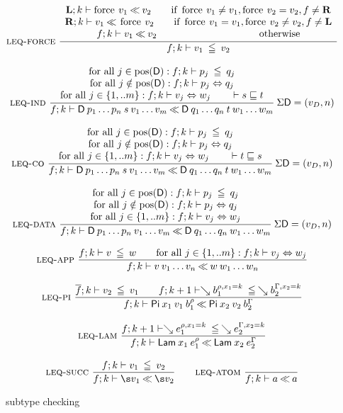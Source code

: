 \begin{figure}[htp]
\begin{gather*}
\nxru{\leqforce}
{\FleqVal{\lF}{k}{\forc \: v_1}{v_2} \qquad \mbox{if } \forc \: v_1 \neq v_1 , \forc \: v_2 = v_2  , f \neq \rF
}
{\FleqVal{\rF}{k}{v_1}{\forc \: v_2} \qquad \mbox{if } \forc \: v_1 = v_1 , \forc \: v_2 \neq v_2 , f \neq \lF }
{\FleqVal{f}{k}{v_1}{v_2} \qquad \qquad \qquad \qquad \qquad \mbox{ otherwise}}
{\LeqVal{f}{k}{v_1}{v_2}}
\\[2ex]
\nxru{\leqappind}
{\mbox{for all } j \in \pos(\DD): \LeqVal{f}{k}{p_j}{q_j} 
}
{
\mbox{for all } j \notin \pos(\DD): \EqVal{f}{k}{p_j}{q_j} 
}
{\mbox{for all } j \in \{1,..m\}: \EqVal{f}{k}{v_j}{w_j}
\qquad
\SzLeq s t }
{\FleqVal{f}{k}{\DD \: p_1 \ldots p_n \: s \: v_1 \ldots v_m}{\DD \: q_1 \ldots q_n \: t \: w_1 \ldots w_m}}
{\: \Sig \DD = (v_D,n)}
\\[2ex]
\nxru{\leqappco}
{\mbox{for all } j \in \pos(\DD): \LeqVal{f}{k}{p_j}{q_j} 
}
{
\mbox{for all } j \notin \pos(\DD): \EqVal{f}{k}{p_j}{q_j}
}
{\mbox{for all } j \in \{1,..m\}:\EqVal{f}{k}{v_j}{w_j}
\qquad
\SzLeq t s }
{\FleqVal{f}{k}{\DD \: p_1 \ldots p_n \: s \: v_1 \ldots v_m}{\DD \: q_1 \ldots q_n \: t \: w_1 \ldots w_m}}
{\: \Sig \DD = (v_D,n)} 
\\[2ex]
\nxru{\leqappd}
{\mbox{for all } j \in \pos(\DD): \LeqVal{f}{k}{p_j}{q_j} 
}
{
\mbox{for all } j \notin \pos(\DD): \EqVal{f}{k}{p_j}{q_j}}
{\mbox{for all } j \in \{1,..m\}:\EqVal{f}{k}{v_j}{w_j}}
{\FleqVal{f}{k}{\DD \: p_1 \ldots p_n \: v_1 \ldots v_m}{\DD \: q_1 \ldots q_n \: w_1 \ldots w_m}}
{\:\Sig \DD = (v_D,n) }
\\[2ex]
\nru{\leqapp}
{\LeqVal{f}{k}{v}{w} \qquad
\mbox{for all } j \in \{1,..m\}:\EqVal{f}{k}{v_j}{w_j}}
{\FleqVal{f}{k}{v \: v_1 \ldots v_n}{w \: w_1 \ldots w_n}}
\\[2ex]
\nru{\leqpi}
{\LeqVal{\overline{f}}{k}{v_2}{v_1}
\qquad
\LeqVal{f}{k+1}{\wh \cl{b_1}{\ins{\rho}{x_1}{k}}}{\wh \cl{b_2}{\ins{\Gamma}{x_2}{k}}}}
{\FleqVal{f}{k}{\vpi \: x_1 \: v_1 \: \cl{b_1}{\rho}}{\vpi \: x_2 \: v_2 \: \cl{b_2}{\Gamma}}}
\\[2ex]
\nru{\leqlam}
{\LeqVal{f}{k+1}{\wh \cl{e_1}{\ins{\rho}{x_1}{k}}}{\wh \cl{e_2}{\ins{\Gamma}{x_2}{k}}}}
{\FleqVal{f}{k}{\vlam \: x_1 \: \cl{e_1}{\rho}}{\vlam \: x_2 \: \cl{e_2}{\Gamma}}}
\\[2ex]
\nru{\leqsuc}
{\LeqVal{f}{k}{v_1}{v_2}}
{\FleqVal{f}{k}{\s v_1}{\s v_2}}
\qquad
\nru{\leqatom}
{}
{\FleqVal{f}{k}{a}{a}}
\end{gather*}
\caption{subtype checking}
\label{fsub}
\end{figure}

